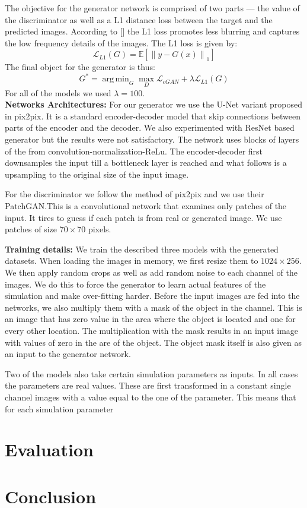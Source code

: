 \documentclass{llncs}
\DeclareMathOperator*{\argminA}{arg\,min} %
\begin{document}
The objective for the generator network is comprised of two parts --- the value of the discriminator as well as a L1 distance loss between the target and the predicted images. According to [] the L1 loss promotes less blurring and captures the low frequency details of the images. The L1 loss is given by:
\begin{equation}
\mathcal{L}_{L1} (G) = \mathbb{E}[\left\lVert y - G(x)\right\rVert_1]
\end{equation}
The final object for the generator is thus:
\begin{equation}
G^* = \argminA_G \max_D \mathcal{L}_{cGAN}  + \lambda \mathcal{L}_{L1} (G)
\end{equation}
For all of the models we used $\lambda = 100$.
\\
\noindent\textbf{Networks Architectures:} For our generator we use the U-Net variant proposed in pix2pix. It is a standard encoder-decoder model that skip connections between parts of the encoder and the decoder. We also experimented with ResNet based generator but the results were not satisfactory. The network uses blocks of layers of the from convolution-normalization-ReLu. The encoder-decoder first downsamples the input till a bottleneck layer is reached and what follows is a upsampling to the original size of the input image.

For the discriminator we follow the method of pix2pix and we use their PatchGAN.\@ This is a convolutional network that examines only patches of the input. It tires to guess if each patch is from real or generated image. We use patches of size $70\times 70$  pixels.

\noindent\textbf{Training details: } We train the described three models with the generated datasets. When loading the images in memory, we first resize them to $1024\times 256$. We then apply random crops as well as add random noise to each channel of the images. We do this to force the generator to learn actual features of the simulation and make over-fitting harder. Before the input images are fed into the networks, we also multiply them with a mask of the object in the channel. This is an image that has zero value in the area where the object is located and one for every other location. The multiplication with the mask results in an input image with values of zero in the are of the object. The object mask itself is also given as an input to the generator network.

Two of the models also take certain simulation parameters as inputs. In all cases the parameters are real values. These are first transformed in a constant single channel images with a value equal to the one of the parameter. This means that for each simulation parameter 



\section{Evaluation}\label{eval}



\section{Conclusion}\label{conclusion}



\clearpage


\end{document}
